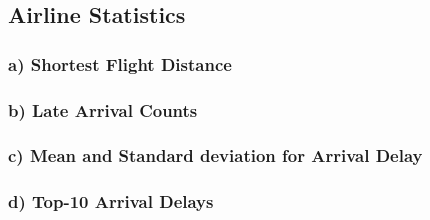 \subsection{Airline Statistics}

\subsubsection*{a) Shortest Flight Distance}




\subsubsection*{b) Late Arrival Counts}




\subsubsection*{c) Mean and Standard deviation for Arrival Delay}



\subsubsection*{d) Top-10 Arrival Delays}




